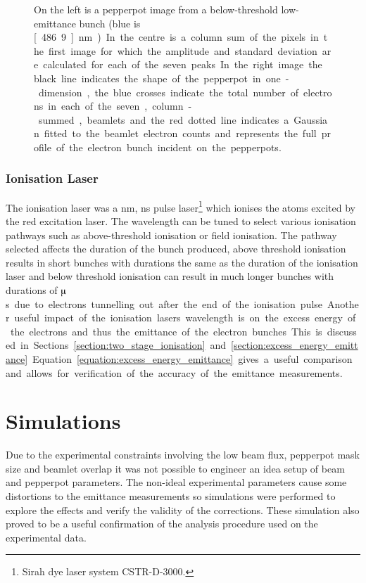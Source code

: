 \begin{figure}
    \center
    
    \caption{On the left is a pepperpot image from a below-threshold low-emittance bunch (blue is \unit[486.9]{nm}). In the centre is a column sum of the pixels in the first image for which the amplitude and standard deviation are calculated for each of the seven peaks. In the right image the black line indicates the shape of the pepperpot in one-dimension, the blue crosses indicate the total number of electrons in each of the seven, column-summed, beamlets and the red dotted line indicates a Gaussian fitted to the beamlet electron counts and represents the full profile of the electron bunch incident on the pepperpots.}
    \label{figure:pepperpot_profile}
\end{figure}

\subsubsection{Ionisation Laser}
The ionisation laser was a \unit[457-493]{nm}, \unit[5]{ns} pulse laser\footnote{Sirah dye laser system CSTR-D-3000.} which ionises the atoms excited by the red excitation laser.
The wavelength can be tuned to select various ionisation pathways such as above-threshold ionisation or field ionisation.
The pathway selected affects the duration of the bunch produced, above threshold ionisation results in short bunches with durations the same as the duration of the ionisation laser and below threshold ionisation can result in much longer bunches with durations of \unit[10s]{$\muup$s} due to electrons tunnelling out after the end of the ionisation pulse.

Another useful impact of the ionisation lasers wavelength is on the excess energy of the electrons and thus the emittance of the electron bunches.
This is discussed in Sections~\ref{section:two_stage_ionisation} and \ref{section:excess_energy_emittance}.
Equation~\ref{equation:excess_energy_emittance} gives a useful comparison and allows for verification of the accuracy of the emittance measurements.

\section{Simulations}\label{section:pepperpot_simulations}

Due to the experimental constraints involving the low beam flux, pepperpot mask size and beamlet overlap it was not possible to engineer an idea setup of beam and pepperpot parameters.
The non-ideal experimental parameters cause some distortions to the emittance measurements so simulations were performed to explore the effects and verify the validity of the corrections.
These simulation also proved to be a useful confirmation of the analysis procedure used on the experimental data.

